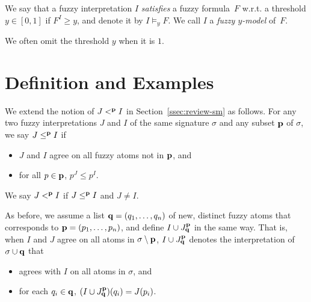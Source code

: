 \documentclass[runningheads]{llncs}
\def\bi{\begin{itemize}}
\def\ei{\end{itemize}}
\def\fand{\otimes}
\begin{document}
\begin{definition}\label{def:fuzzy-m}
We say that a fuzzy interpretation $I$ {\em satisfies} a fuzzy
formula~$F$ w.r.t. a threshold $y\in [0,1]$ if $F^I\ge y$, and
denote it by $I\models_y F$. We call $I$ a {\em fuzzy $y$-model} of~$F$. 
\end{definition}

We often omit the threshold $y$ when it is $1$.






\vspace{-0.3cm}

\section{Definition and Examples} \label{sec:definition} 


We extend the notion of $J<^{\bf p} I$ in Section~\ref{ssec:review-sm} as
follows. 
For any two fuzzy interpretations $J$ and $I$ of the same
signature $\sigma$ and any subset ${\bf p}$ of $\sigma$, we say $J\le ^{\bf p} I$ if
\bi
\item  $J$ and $I$ agree on all fuzzy atoms not in ${\bf p}$, and
\item for all $p \in {\bf p}$, $p^J\le p^I$.
\ei
We say $J<^{\bf p} I$ if $J\le ^{\bf p} I$ and $J\ne I$.

As before, we assume a list ${\bf q}=(q_1,\dots,q_n)$ of new, distinct
fuzzy atoms that corresponds to ${\bf p}=(p_1,\dots,p_n)$, and
define $I\cup J^{\bf p}_{\bf q}$ in the same way. That is, 
when $I$ and $J$ agree on all atoms in $\sigma\setminus {\bf p}$, 
$I\cup J^{\bf p}_{\bf q}$ denotes the interpretation of
$\sigma\cup{\bf q}$ that
\bi
\item  agrees with $I$ on all atoms in $\sigma$, and 
\item  for each $q_i\in {\bf q}$, 
       $(I\cup J^{\bf p}_{\bf q})(q_i)=J(p_i)$.
\ei
\end{document}
